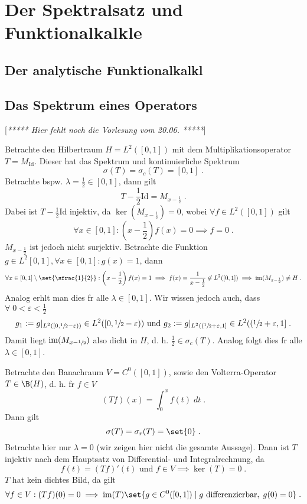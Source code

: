 \chapter{Der Spektralsatz und Funktionalkalk\us le}
\section{Der analytische Funktionalkalk\us l}
\section{Das Spektrum eines Operators}
[\textit{***** Hier fehlt noch die Vorlesung vom 20.06. *****}]

\begin{ex}
	Betrachte den Hilbertraum \(H = L^2([0,1])\) mit dem Multiplikationsoperator \(T = M_\text{Id}\). Dieser hat das Spektrum und kontinuierliche Spektrum
	\[\sigma(T) =\sigma_c(T)= [0,1]\;.\] 
	Betrachte bspw. \(\lambda = \frac{1}{2} \in [0,1]\), dann gilt
	\[T - \frac{1}{2}\text{Id} = M_{x-\frac 12}\;.\]
	Dabei ist \(T-\frac{1}{2}\text{Id}\) injektiv, da \(\ker(M_{x-\frac 12}) = 0\), wobei \(\forall f\in L^2([0,1])\) gilt
	\[\forall x \in [0,1]: \left(x-\frac12\right)f(x) = 0 \implies f = 0\;.\]
	\(M_{x-\frac 12}\) ist jedoch nicht surjektiv. Betrachte die Funktion \(g\in L^2[0,1], \forall x \in [0,1]: g(x) = 1\), dann
	\[\forall x \in [0,1]\setminus\set{\sfrac{1}{2}}: \left(x-\frac 12\right) f(x) = 1 \implies f(x) = \frac{1}{x - \frac 12} \not\in L^2([0,1]) \implies \text{im}(M_{x-\frac12}) \neq H\;.\]
	Analog erh\as lt man dies f\us r alle \(\lambda \in [0,1]\). Wir wissen jedoch auch, dass \(\forall \;0< \varepsilon < \frac12\)
	\[g_1 := g\vert_{L^2([0,\sfrac 12 - \varepsilon))} \in L^2([0, \sfrac12 - \varepsilon)) \text{ und } g_2 := g\vert_{L^2((\sfrac 12 + \varepsilon,1]} \in L^2((\sfrac 12 + \varepsilon,1]\;.\]
	Damit liegt \(\text{im}(M_{x-\sfrac 12})\) also dicht in $H$, d. h. \(\frac 12 \in \sigma_c(T)\). Analog folgt dies f\us r alle \(\lambda  \in [0,1]\).
\end{ex}

\begin{ex}
	Betrachte den Banachraum \(V = C^0([0,1])\), sowie den Volterra-Operator \(T\in \B(H)\), d. h. f\us r \(f \in V\)
	\[(Tf)(x) = \int_0^x f(t) \;dt\;.\]
	Dann gilt 
	\[\sigma(T) = \sigma_r(T) = \set{0}\;.\]
	Betrachte hier nur \(\lambda = 0\) (wir zeigen hier nicht die gesamte Aussage). Dann ist $T$ injektiv nach dem Hauptsatz von Differential- und Integralrechnung, da 
	\[f(t) = (Tf)'(t) \text{ und } f \in V \implies \ker(T) = {0}\;.\]  
	$T$ hat kein dichtes Bild, da gilt
	\[\forall f \in V: (Tf)(0) = 0 \implies \text{im}(T) \set{g \in C^0([0,1])\;\vert\; g \text{ differenzierbar}, \;g(0) = 0} \;.\]
\end{ex}

